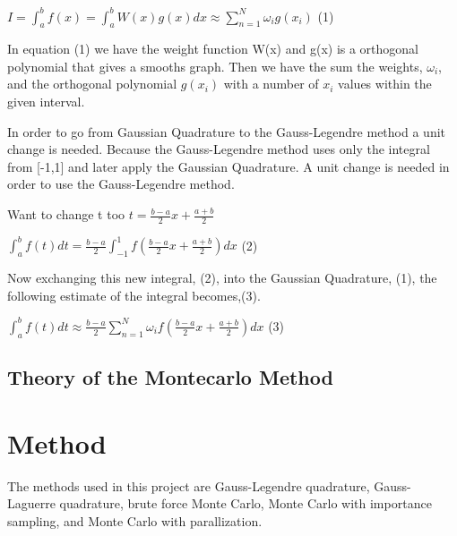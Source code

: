 \documentclass{article}
\begin{document}
$I = \int_{a}^{b} f(x) = \int_{a}^{b}W(x)g(x)dx \approx  \sum_{n=1}^{N}  \omega_i g(x_i) $ (1)
\newline
\newline

In equation (1) we have the weight function W(x) and g(x) is a orthogonal polynomial that gives a smooths graph. Then we have the sum the weights, $\omega_i$, and the orthogonal polynomial $g(x_i)$ with a number of $x_i$ values within the given interval.
\newline
\newline

In order to go from Gaussian Quadrature to the Gauss-Legendre method a unit change is needed. Because the Gauss-Legendre method uses only the integral from [-1,1] and later apply the Gaussian Quadrature. A unit change is needed in order to use the Gauss-Legendre method.
\newline
\newline

Want to change t too $t = \frac{b-a}{2}x + \frac{a+b}{2}$
\newline
\newline

$\int_{a}^{b} f(t) dt = \frac{b-a}{2}\int_{-1}^{1} f(\frac{b-a}{2}x + \frac{a+b}{2}) dx$ (2)
\newline
\newline

Now exchanging this new integral, (2), into the Gaussian Quadrature, (1), the following estimate of the integral becomes,(3).
\newline
\newline

$\int_{a}^{b} f(t) dt \approx \frac{b-a}{2} \sum_{n=1}^{N} \omega_i f(\frac{b-a}{2}x + \frac{a+b}{2}) dx$ (3)


\subsection{Theory of the Montecarlo Method}




\vspace{1cm}

\section{Method} \label{sec:Method}

The methods used in this project are Gauss-Legendre quadrature, Gauss-Laguerre quadrature, brute force Monte Carlo, Monte Carlo with importance sampling, and Monte Carlo with parallization.
\end{document}
